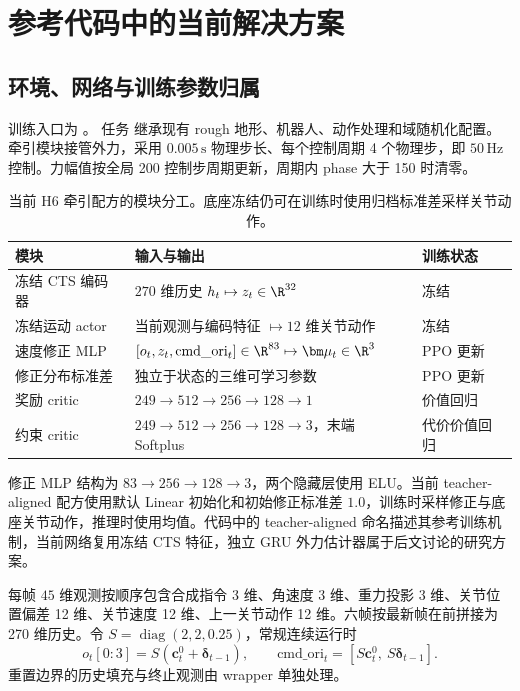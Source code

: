 \section{参考代码中的当前解决方案}
\subsection{环境、网络与训练参数归属}
训练入口为 。
任务  继承现有 rough 地形、机器人、动作处理和域随机化配置。牵引模块接管外力，采用 $0.005\,\mathrm{s}$ 物理步长、每个控制周期 4 个物理步，即 $50\,\mathrm{Hz}$ 控制。力幅值按全局 200 控制步周期更新，周期内 phase 大于 150 时清零。

\begin{table}[htbp]\centering\small
\begin{tabularx}{\linewidth}{P{32mm}YP{23mm}}
\toprule 模块 & 输入与输出 & 训练状态\\\midrule
冻结 CTS 编码器 & $270$ 维历史 $h_t\mapsto z_t\in\R^{32}$ & 冻结\\
冻结运动 actor & 当前观测与编码特征 $\mapsto12$ 维关节动作 & 冻结\\
速度修正 MLP & $[o_t,z_t,\mathrm{cmd\_ori}_t]\in\R^{83}\mapsto\bm\mu_t\in\R^3$ & PPO 更新\\
修正分布标准差 & 独立于状态的三维可学习参数 & PPO 更新\\
奖励 critic & $249\to512\to256\to128\to1$ & 价值回归\\
约束 critic & $249\to512\to256\to128\to3$，末端 Softplus & 代价价值回归\\\bottomrule
\end{tabularx}
\caption{当前 H6 牵引配方的模块分工。底座冻结仍可在训练时使用归档标准差采样关节动作。}
\end{table}

修正 MLP 结构为 $83\to256\to128\to3$，两个隐藏层使用 ELU。当前 teacher-aligned 配方使用默认 Linear 初始化和初始修正标准差 $1.0$，训练时采样修正与底座关节动作，推理时使用均值。代码中的 teacher-aligned 命名描述其参考训练机制，当前网络复用冻结 CTS 特征，独立 GRU 外力估计器属于后文讨论的研究方案。

每帧 $45$ 维观测按顺序包含合成指令 3 维、角速度 3 维、重力投影 3 维、关节位置偏差 12 维、关节速度 12 维、上一关节动作 12 维。六帧按最新帧在前拼接为 270 维历史。令 $S=\operatorname{diag}(2,2,0.25)$，常规连续运行时
\begin{equation}
 o_t[0{:}3]=S(\bm c^0_t+\bm\delta_{t-1}),\qquad
 \mathrm{cmd\_ori}_t=[S\bm c^0_t,\ S\bm\delta_{t-1}].
\label{eq:redundant}
\end{equation}
重置边界的历史填充与终止观测由 wrapper 单独处理。

